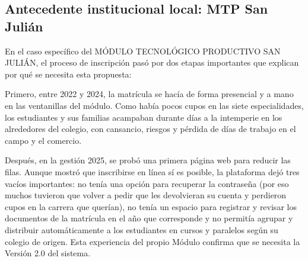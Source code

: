 \subsection{Antecedente institucional local: MTP San Julián}

En el caso específico del MÓDULO TECNOLÓGICO PRODUCTIVO SAN JULIÁN, el proceso de inscripción pasó por dos etapas importantes que explican por qué se necesita esta propuesta:

Primero, entre 2022 y 2024, la matrícula se hacía de forma presencial y a mano en las ventanillas del módulo. Como había pocos cupos en las siete especialidades, los estudiantes y sus familias acampaban durante días a la intemperie en los alrededores del colegio, con cansancio, riesgos y pérdida de días de trabajo en el campo y el comercio.

Después, en la gestión 2025, se probó una primera página web para reducir las filas. Aunque mostró que inscribirse en línea sí es posible, la plataforma dejó tres vacíos importantes: no tenía una opción para recuperar la contraseña (por eso muchos tuvieron que volver a pedir que les devolvieran su cuenta y perdieron cupos en la carrera que querían), no tenía un espacio para registrar y revisar los documentos de la matrícula en el año que corresponde y no permitía agrupar y distribuir automáticamente a los estudiantes en cursos y paralelos según su colegio de origen. Esta experiencia del propio Módulo confirma que se necesita la Versión 2.0 del sistema.
